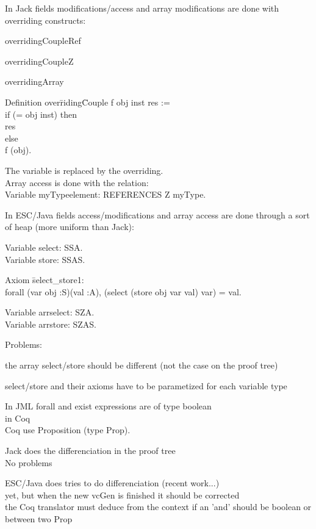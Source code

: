 \small
In Jack fields modifications/access and array modifications are done with 
 {\purple overriding constructs}:
\blist
\item overridingCoupleRef
\item overridingCoupleZ
\item overridingArray
\elist
\begin{tabbing}
 {\purple Definition} over\=riding\=Couple f obj inst res  := \+ \\
 if (= obj inst) then  \+ \\
      res \- \\
 else\+ \\
    f (obj).
\end{tabbing}
The variable is replaced by the overriding.\\
Array access is done with the relation: \\
 {\purple Variable} myTypeelement: REFERENCES \rarrow Z \rarrow myType. 

\small
In ESC/Java fields access/modifications and array access are done through a sort of  {\purple heap} (more uniform than Jack):

 {\purple Variable} select: S\rarrow S\rarrow A.\\
 {\purple Variable} store: S\rarrow S\rarrow A\rarrow S.
 \begin{tabbing}
 {\purple Axiom} \= select\_store1: \+\\
 {\purple forall} (var obj :S)(val :A), (select (store obj var val) var) = val.
 \end{tabbing}
 {\purple Variable} arrselect: S\rarrow Z\rarrow A.\\
 {\purple Variable} arrstore: S\rarrow Z\rarrow A\rarrow S.

Problems: 
\blist
\item the array select/store should be different
(not the case on the proof tree)
\item select/store and their axioms have to be parametized 
for {\purple each variable type}
\elist

\small
In JML forall and exist expressions are of type boolean\\
 in Coq\\
Coq use Proposition (type Prop).
\blist
\item Jack does the differenciation in the proof tree \\
\rarrow No problems
\item ESC/Java does tries to do differenciation (recent work...)\\
 yet, but when the new vcGen is finished
 it should be corrected\\
\rarrow the Coq translator must deduce from the context if an 'and' should be
boolean or between two Prop
\elist

